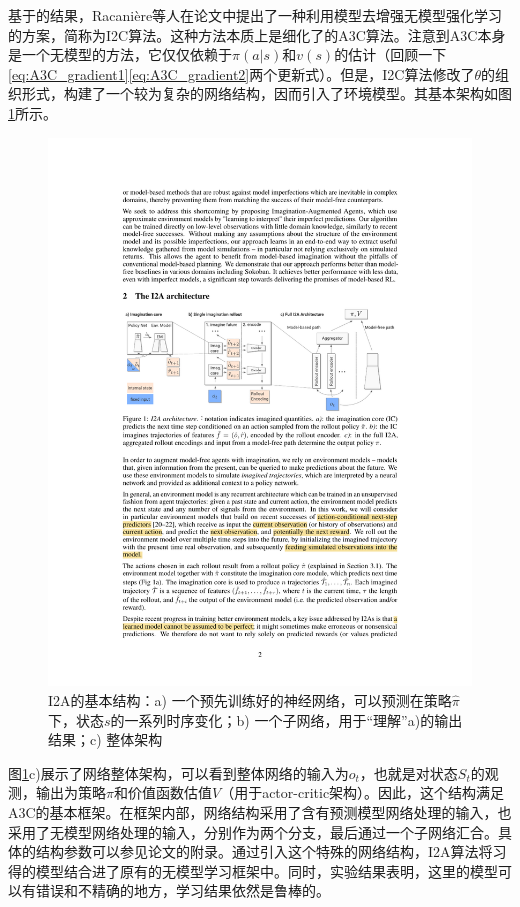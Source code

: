 \documentclass[degree=bachelor, tocarialchapter, pifootnote]{thuthesis}
\begin{document}
      基于\cite{action-conditional_prediction}的结果，Racani\`{e}re等人在论文\cite{I2A}中提出了一种利用模型去增强无模型强化学习的方案，简称为I2C算法。这种方法本质上是细化了的A3C算法。注意到A3C本身是一个无模型的方法，它仅仅依赖于$\pi(a|s)$和$v(s)$的估计（回顾一下\eqref{eq:A3C_gradient1}\eqref{eq:A3C_gradient2}两个更新式）。但是，I2C算法修改了$\theta$的组织形式，构建了一个较为复杂的网络结构，因而引入了环境模型。其基本架构如图\ref{fig:I2A}所示。
      \begin{figure}[H] %
        \centering
        \includegraphics{I2A}
        \caption{I2A的基本结构：a) 一个预先训练好的神经网络，可以预测在策略$\hat{\pi}$下，状态$s$的一系列时序变化；b) 一个子网络，用于``理解''a)的输出结果；c) 整体架构}
        \label{fig:I2A}
      \end{figure}
      \par 图\ref{fig:I2A}c)展示了网络整体架构，可以看到整体网络的输入为$o_t$，也就是对状态$S_t$的观测，输出为策略$\pi$和价值函数估值$V$（用于actor-critic架构）。因此，这个结构满足A3C的基本框架。在框架内部，网络结构采用了含有预测模型网络处理的输入，也采用了无模型网络处理的输入，分别作为两个分支，最后通过一个子网络汇合。具体的结构参数可以参见论文\cite{I2A}的附录。通过引入这个特殊的网络结构，I2A算法将习得的模型结合进了原有的无模型学习框架中。同时，实验结果表明，这里的模型可以有错误和不精确的地方，学习结果依然是鲁棒的。
  
\end{document}
